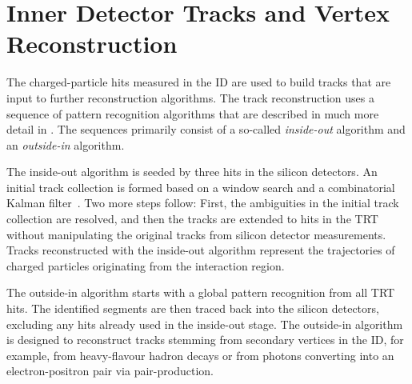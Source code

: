 \section{Inner Detector Tracks and Vertex Reconstruction}
The charged-particle hits measured in the ID are used to build tracks that are input to further reconstruction algorithms.
The track reconstruction uses a sequence of pattern recognition algorithms that are described in much more detail in . The sequences primarily consist of a so-called \emph{inside-out} algorithm and an \emph{outside-in} algorithm.

The inside-out algorithm is seeded by three hits in the silicon detectors. An initial track collection is formed based on a window search and a combinatorial Kalman filter~\cite{fruhwirth_application_1987}. Two more steps follow: First, the ambiguities in the initial track collection are resolved, and then the tracks are extended to hits in the TRT without manipulating the original tracks from silicon detector measurements. Tracks reconstructed with the inside-out algorithm represent the trajectories of charged particles originating from the interaction region.

The outside-in algorithm starts with a global pattern recognition from all TRT hits. The identified segments are then traced back into the silicon detectors, excluding any hits already used in the inside-out stage. The outside-in algorithm is designed to reconstruct tracks stemming from secondary vertices in the ID, for example, from heavy-flavour hadron decays or from photons converting into an electron-positron pair via pair-production.



